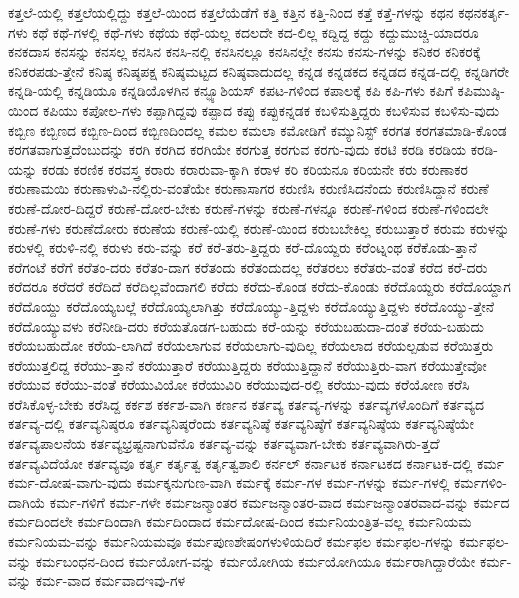 {ಕತ್ತಲೆ-ಯಲ್ಲಿ
ಕತ್ತಲೆಯಲ್ಲಿದ್ದು
ಕತ್ತಲೆ-ಯಿಂದ
ಕತ್ತಲೆಯೆಡೆಗೆ
ಕತ್ತಿ
ಕತ್ತಿನ
ಕತ್ತಿ-ನಿಂದ
ಕತ್ತೆ
ಕತ್ತೆ-ಗಳನ್ನು
ಕಥನ
ಕಥನಕರ್ತೃ-ಗಳು
ಕಥೆ
ಕಥೆ-ಗಳಲ್ಲಿ
ಕಥೆ-ಗಳು
ಕಥೆಯ
ಕಥೆ-ಯಲ್ಲ
ಕದಲದೇ
ಕದ-ಲಿಲ್ಲ
ಕದ್ದಿದ್ದ
ಕದ್ದು
ಕದ್ದುಮುಚ್ಚಿ-ಯಾದರೂ
ಕನಕದಾಸ
ಕನಸನ್ನು
ಕನಸಲ್ಲ
ಕನಸಿನ
ಕನಸಿ-ನಲ್ಲಿ
ಕನಸಿನಲ್ಲೂ
ಕನಸಿನಲ್ಲೇ
ಕನಸು
ಕನಸು-ಗಳನ್ನು
ಕನಿಕರ
ಕನಿಕರಕ್ಕೆ
ಕನಿಕರಪಡು-ತ್ತೇನೆ
ಕನಿಷ್ಠ
ಕನಿಷ್ಠಪಕ್ಷ
ಕನಿಷ್ಠಮಟ್ಟದ
ಕನಿಷ್ಠವಾದುದಲ್ಲ
ಕನ್ನಡ
ಕನ್ನಡಕದ
ಕನ್ನಡದ
ಕನ್ನಡ-ದಲ್ಲಿ
ಕನ್ನಡಿಗರೇ
ಕನ್ನಡಿ-ಯಲ್ಲಿ
ಕನ್ನಡಿಯೂ
ಕನ್ನಡಿಯೊಳಗಿನ
ಕನ್ಫ್ಯೂಶಿಯಸ್
ಕಪಟ-ಗಳಿಂದ
ಕಪಾಲಕ್ಕೆ
ಕಪಿ
ಕಪಿ-ಗಳು
ಕಪಿಗೆ
ಕಪಿಮುಷ್ಠಿ-ಯಿಂದ
ಕಪಿಯು
ಕಪೋಲ-ಗಳು
ಕಪ್ಪಾಗಿದ್ದವು
ಕಪ್ಪಾದ
ಕಪ್ಪು
ಕಪ್ಪುಕನ್ನಡಕ
ಕಬಳಿಸುತ್ತಿದ್ದರು
ಕಬಳಿಸುವ
ಕಬಳಿಸು-ವುದು
ಕಬ್ಬಿಣ
ಕಬ್ಬಿಣದ
ಕಬ್ಬಿಣ-ದಿಂದ
ಕಬ್ಬಿಣದಿಂದಲ್ಲ
ಕಮಲ
ಕಮಲಾ
ಕಮೋಡಿಗೆ
ಕಮ್ಯುನಿಸ್ಟ್
ಕರಗತ
ಕರಗತಮಾಡಿ-ಕೊಂಡ
ಕರಗತವಾಗುತ್ತದೆಂಬುದನ್ನು
ಕರಗಿ
ಕರಗಿದ
ಕರಗಿಯೇ
ಕರಗುತ್ತ
ಕರಗುವ
ಕರಗು-ವುದು
ಕರಟಿ
ಕರಡಿ
ಕರಡಿಯ
ಕರಡಿ-ಯನ್ನು
ಕರಡು
ಕರಣಿಕ
ಕರವಸ್ತ್ರ
ಕರಾರು
ಕರಾರುವಾ-ಕ್ಕಾಗಿ
ಕರಾಳ
ಕರಿ
ಕರಿಯನೂ
ಕರಿಯನೇ
ಕರು
ಕರುಣಾಕರ
ಕರುಣಾಮಯಿ
ಕರುಣಾಳುವಿ-ನಲ್ಲಿರು-ವಂತೆಯೇ
ಕರುಣಾಸಾಗರ
ಕರುಣಿಸಿ
ಕರುಣಿಸಿದನೆಂದು
ಕರುಣಿಸಿದ್ದಾನೆ
ಕರುಣೆ
ಕರುಣೆ-ದೋರ-ದಿದ್ದರೆ
ಕರುಣೆ-ದೋರ-ಬೇಕು
ಕರುಣೆ-ಗಳನ್ನು
ಕರುಣೆ-ಗಳನ್ನೂ
ಕರುಣೆ-ಗಳಿಂದ
ಕರುಣೆ-ಗಳಿಂದಲೇ
ಕರುಣೆ-ಗಳು
ಕರುಣೆದೋರು
ಕರುಣೆಯ
ಕರುಣೆ-ಯಲ್ಲಿ
ಕರುಣೆ-ಯಿಂದ
ಕರುಬಬೇಕಿಲ್ಲ
ಕರುಬುತ್ತಾರೆ
ಕರುಮ
ಕರುಳನ್ನು
ಕರುಳಲ್ಲಿ
ಕರುಳಿ-ನಲ್ಲಿ
ಕರುಳು
ಕರು-ವನ್ನು
ಕರೆ
ಕರೆ-ತರು-ತ್ತಿದ್ದರು
ಕರೆ-ದೊಯ್ದರು
ಕರೆಂಟ್ನಂಥ
ಕರೆಕೊಡು-ತ್ತಾನೆ
ಕರೆಗಂಟೆ
ಕರೆಗೆ
ಕರೆತಂ-ದರು
ಕರೆತಂ-ದಾಗ
ಕರೆತಂದು
ಕರೆತಂದುದಲ್ಲ
ಕರೆತರಲು
ಕರೆತರು-ವಂತೆ
ಕರೆದ
ಕರೆ-ದರು
ಕರೆದರೂ
ಕರೆದರೆ
ಕರೆದಿದೆ
ಕರೆದಿಲ್ಲವೆಂದಾಗಲಿ
ಕರೆದು
ಕರೆದು-ಕೊಂಡ
ಕರೆದು-ಕೊಂಡು
ಕರೆದೊಯ್ದರು
ಕರೆದೊಯ್ದಾಗ
ಕರೆದೊಯ್ದು
ಕರೆದೊಯ್ಯಬಲ್ಲೆ
ಕರೆದೊಯ್ಯಲಾಗಿತ್ತು
ಕರೆದೊಯ್ಯು-ತ್ತಿದ್ದಳು
ಕರೆದೊಯ್ಯುತ್ತಿದ್ದಳು
ಕರೆದೊಯ್ಯು-ತ್ತೇನೆ
ಕರೆದೊಯ್ಯುವಳು
ಕರೆನೀಡಿ-ದರು
ಕರೆಯತೊಡಗ-ಬಹುದು
ಕರೆ-ಯನ್ನು
ಕರೆಯಬಹುದಾ-ದಂತೆ
ಕರೆಯ-ಬಹುದು
ಕರೆಯಬಹುದೋ
ಕರೆಯ-ಲಾಗಿದೆ
ಕರೆಯಲಾಗುವ
ಕರೆಯಲಾಗು-ವುದಿಲ್ಲ
ಕರೆಯಲಾದ
ಕರೆಯಲ್ಪಡುವ
ಕರೆಯಿತ್ತರು
ಕರೆಯುತ್ತಲಿದ್ದ
ಕರೆಯು-ತ್ತಾನೆ
ಕರೆಯುತ್ತಾರೆ
ಕರೆಯುತ್ತಿದ್ದರು
ಕರೆಯುತ್ತಿದ್ದಾನೆ
ಕರೆಯುತ್ತಿರು-ವಾಗ
ಕರೆಯುತ್ತೇವೋ
ಕರೆಯುವ
ಕರೆಯು-ವಂತೆ
ಕರೆಯುವಿಯೋ
ಕರೆಯುವಿರಿ
ಕರೆಯುವುದ-ರಲ್ಲಿ
ಕರೆಯು-ವುದು
ಕರೆಯೋಣ
ಕರೆಸಿ
ಕರೆಸಿಕೊಳ್ಳ-ಬೇಕು
ಕರೆಸಿದ್ದ
ಕರ್ಕಶ
ಕರ್ಕಶ-ವಾಗಿ
ಕರ್ಣನ
ಕರ್ತವ್ಯ
ಕರ್ತವ್ಯ-ಗಳನ್ನು
ಕರ್ತವ್ಯಗಳೊಂದಿಗೆ
ಕರ್ತವ್ಯದ
ಕರ್ತವ್ಯ-ದಲ್ಲಿ
ಕರ್ತವ್ಯನಿಷ್ಠರೂ
ಕರ್ತವ್ಯನಿಷ್ಠರೆಂದು
ಕರ್ತವ್ಯನಿಷ್ಠೆ
ಕರ್ತವ್ಯನಿಷ್ಠೆಗೆ
ಕರ್ತವ್ಯನಿಷ್ಠೆಯ
ಕರ್ತವ್ಯನಿಷ್ಠೆಯೇ
ಕರ್ತವ್ಯಪಾಲನೆಯ
ಕರ್ತವ್ಯಭ್ರಷ್ಟನಾಗುವೆನೊ
ಕರ್ತವ್ಯ-ವನ್ನು
ಕರ್ತವ್ಯವಾಗ-ಬೇಕು
ಕರ್ತವ್ಯವಾಗಿರು-ತ್ತದೆ
ಕರ್ತವ್ಯವಿದೆಯೋ
ಕರ್ತವ್ಯವೂ
ಕರ್ತೃ
ಕರ್ತೃತ್ವ
ಕರ್ತೃತ್ವಶಾಲಿ
ಕರ್ನಲ್
ಕರ್ನಾಟಕ
ಕರ್ನಾಟಕದ
ಕರ್ನಾಟಕ-ದಲ್ಲಿ
ಕರ್ಮ
ಕರ್ಮ-ದೋಷ-ವಾಗು-ವುದು
ಕರ್ಮಕ್ಕನುಗುಣ-ವಾಗಿ
ಕರ್ಮಕ್ಕೆ
ಕರ್ಮ-ಗಳ
ಕರ್ಮ-ಗಳನ್ನು
ಕರ್ಮ-ಗಳಲ್ಲಿ
ಕರ್ಮಗಳಿಂ-ದಾಗಿಯೆ
ಕರ್ಮ-ಗಳಿಗೆ
ಕರ್ಮ-ಗಳೇ
ಕರ್ಮಜನ್ಮಾಂತರ
ಕರ್ಮಜನ್ಮಾಂತರ-ವಾದ
ಕರ್ಮಜನ್ಮಾಂತರವಾದ-ವನ್ನು
ಕರ್ಮದ
ಕರ್ಮದಿಂದಲೇ
ಕರ್ಮದಿಂದಾಗಿ
ಕರ್ಮದಿಂದಾದ
ಕರ್ಮದೋಷ-ದಿಂದ
ಕರ್ಮನಿಯಂತ್ರಿತ-ವಲ್ಲ
ಕರ್ಮನಿಯಮ
ಕರ್ಮನಿಯಮ-ವನ್ನು
ಕರ್ಮನಿಯಮವೂ
ಕರ್ಮಪುಣಶೇಷಂಗಳುಳಿಯದಿರೆ
ಕರ್ಮಫಲ
ಕರ್ಮಫಲ-ಗಳನ್ನು
ಕರ್ಮಫಲ-ವನ್ನು
ಕರ್ಮಬಂಧನ-ದಿಂದ
ಕರ್ಮಯೋಗ-ವನ್ನು
ಕರ್ಮಯೋಗಿಯ
ಕರ್ಮಯೋಗಿಯೂ
ಕರ್ಮರಾಗಿದ್ದಾರೆಯೇ
ಕರ್ಮ-ವನ್ನು
ಕರ್ಮ-ವಾದ
ಕರ್ಮವಾದಇವು-ಗಳ
}
